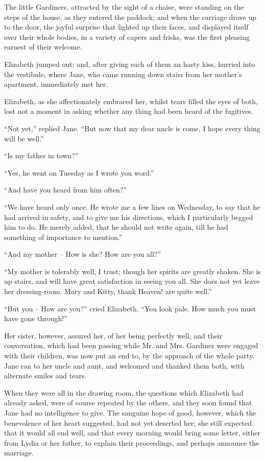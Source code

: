 The little Gardiners, attracted by the sight of a chaise,
were standing on the steps of the house, as they entered
the paddock; and when the carriage drove up to the door,
the joyful surprise that lighted up their faces, and displayed
itself over their whole bodies, in a variety of capers
and frisks, was the first pleasing earnest of their welcome.

Elizabeth jumped out; and, after giving each of them
an hasty kiss, hurried into the vestibule, where Jane, who
came running down stairs from her mother’s apartment,
immediately met her.

Elizabeth, as she affectionately embraced her, whilst
tears filled the eyes of both, lost not a moment in asking
whether any thing had been heard of the fugitives.

“Not yet,” replied Jane. “But now that my dear
uncle is come, I hope every thing will be well.”

“Is my father in town?”

“Yes, he went on Tuesday as I wrote you word.”

“And have you heard from him often?”

“We have heard only once. He wrote me a few lines
on Wednesday, to say that he had arrived in safety, and
to give me his directions, which I particularly begged him
to do. He merely added, that he should not write again,
till he had something of importance to mention.”

“And my mother -- How is she? How are you all?”

“My mother is tolerably well, I trust; though her
spirits are greatly shaken. She is up stairs, and will have
great satisfaction in seeing you all. She does not yet
leave her dressing-room. Mary and Kitty, thank Heaven!
are quite well.”

“But you -- How are you?” cried Elizabeth. “You
look pale. How much you must have gone through!”

Her sister, however, assured her, of her being perfectly
well; and their conversation, which had been passing
while Mr. and Mrs. Gardiner were engaged with their
children, was now put an end to, by the approach of the
whole party. Jane ran to her uncle and aunt, and welcomed
and thanked them both, with alternate smiles and
tears.

When they were all in the drawing room, the questions
which Elizabeth had already asked, were of course
repeated by the others, and they soon found that Jane
had no intelligence to give. The sanguine hope of good,
however, which the benevolence of her heart suggested,
had not yet deserted her; she still expected that it would
all end well, and that every morning would bring some
letter, either from Lydia or her father, to explain their
proceedings, and perhaps announce the marriage.

